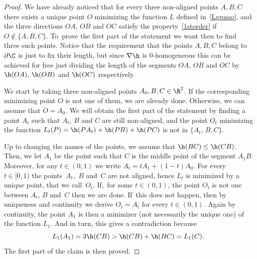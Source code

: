 \begin{proof}
We have already noticed that for every three non-aligned points $A,B,C$ there exists a unique point $O$ minimizing the function $L$ defined in~\eqref{Lgrosso}, and the three directions $OA,\,OB$ and $OC$ satisfy the property~\eqref{1storder} if $O\notin \{A,B,C\}$. To~prove the first part of the statement we want then to find three such points. Notice that the requirement that the points $A,B,C$ belong to $\partial\C$ is just to fix their length, but since $\nabla\h$ is $0$-homogeneous this can be achieved for free just dividing the length of the segments $OA,\,OB$ and $OC$ by $\h(OA),\,\h(OB)$ and $\h(OC)$ respectively.

We start by taking three non-aligned points $A_0,B,C\in\R^2$. If the corresponding minimizing point $O$ is not one of them, we are already done. Otherwise, we can assume that $O=A_0$. We will obtain the first part of the statement by finding a point $A_t$ such that $A_t,\,B$ and $C$ are still non-aligned, and the point $O_t$ minimizing the function $L_t(P)=\h(PA_t)+ \h(PB)+\h(PC)$ is not in $\{A_t,\,B,C\}$.

Up to changing the names of the points, we assume that $\h(BC)\leq \h(CB)$. Then, we let $A_1$ be the point such that $C$ is the middle point of the segment $A_1 B$. Moreover, for any $t\in(0,1)$ we write $A_t=tA_1 + (1-t)A_0$. For every $t\in[0,1)$ the points~$A_t$,~$B$ and~$C$ are not aligned, hence $L_t$ is minimized by a unique point, that we call~$O_t$. If,~for some $t\in(0,1)$, the point $O_t$ is not one between $A_t$, $B$ and~$C$ then we are done. If~this does not happen, then by uniqueness and continuity we derive $O_t=A_t$ for every $t\in(0,1)$. Again by continuity, the point $A_1$ is then a minimizer (not necessarily the unique one) of the function $L_1$. And in turn, this gives a contradiction because
\[
L_1(A_1) = 3 \h(CB) > \h(CB) +\h(BC) = L_1(C).
\]
The first part of the claim is then proved.


\end{proof}
